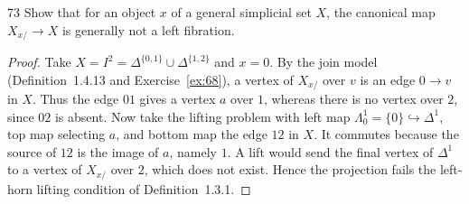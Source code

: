 \begin{exercise}{73}
Show that for an object $x$ of a general simplicial set $X$, the canonical map
$X_{x/}\to X$ is generally not a left fibration.

\begin{proof}
Take $X=I^2=\Delta^{\{0,1\}}\cup\Delta^{\{1,2\}}$
and $x=0$.
By the join model (Definition~1.4.13 and
Exercise~\ref{ex:68}), a vertex of $X_{x/}$ over $v$
is an edge $0\to v$ in $X$.
Thus the edge $01$ gives a vertex $a$ over $1$, whereas
there is no vertex over $2$, since $02$ is absent.
Now take the lifting problem with left map
$\Lambda^1_0=\{0\}\hookrightarrow\Delta^1$, top map
selecting $a$, and bottom map the edge $12$ in $X$.
It commutes because the source of $12$ is the image of
$a$, namely $1$.
A lift would send the final vertex of $\Delta^1$ to a
vertex of $X_{x/}$ over $2$, which does not exist.
Hence the projection fails the left-horn lifting
condition of Definition~1.3.1.
\end{proof}
\end{exercise}
